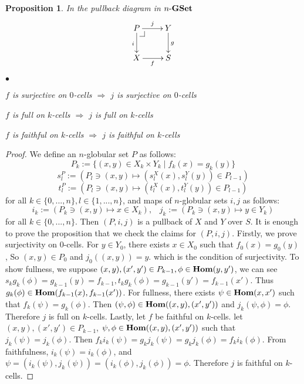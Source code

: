 \documentclass[12pt]{article}
\makeatletter
\theoremstyle{plain}
\newtheorem{proposition}[theorem]{Proposition}
\theoremstyle{definition}
\newcommand{\pullbackmark}[2]{\save ;p+<.8pc,0pc>:(0,-1)::%
(#1) *{\phantom{Z}} %
;p+(#2)-(0,0) **@{-}%
;p-(#1)+(0,0) *{\phantom{Z}} **@{-} \restore}
\makeatother
\begin{document}
\begin{proposition}
In the pullback diagram in $n \mathchar`- {\bf GSet}$
\[ \xymatrix{
 P \pullbackmark{1,0}{0,1} \ar[r]^j \ar[d]_i & Y \ar[d]^g \\
 X \ar[r]_f & S
} \]
\begin{list}{$\bullet$}{}
\item $f$ is surjective on $0$-cells $\Rightarrow$ $j$ is surjective on $0$-cells
\item $f$ is full on $k$-cells $\Rightarrow$ $j$ is full on $k$-cells
\item $f$ is faithful on $k$-cells $\Rightarrow$ $j$ is faithful on $k$-cells
\end{list}
\end{proposition}

\begin{proof} We define an $n$-globular set $P$ as follows:
\[ P_k := \{ (x,y) \in X_k \times Y_k \mid f_k(x)=g_k(y) \}  \]
\[ s_l^P := ( P_l \ni (x,y) \mapsto (s_l^X (x), s_l^Y (y) ) \in P_{l-1} ) \]
\[ t_l^P := ( P_l \ni (x,y) \mapsto (t_l^X (x), t_l^Y (y) ) \in P_{l-1} ) \]
for all $k \in \{ 0,...,n \}, l \in \{ 1,...,n \}$, and maps of $n$-globular sets $i,j$ as follows:
\[
i_k := (P_k \ni (x,y) \mapsto x \in X_k), \hspace{10pt} j_k := (P_k \ni (x,y) \mapsto y \in Y_k)
\]
for all $k \in \{ 0,...,n \}$. Then $(P,i,j)$ is a pullback of $X$ and $Y$ over $S$. It is enough to prove the proposition that we check the claims for $(P,i,j)$.
Firstly, we prove surjectivity on $0$-cells. For $y \in Y_0$, there exists $x \in X_0$ such that $f_{0}(x)=g_{0}(y)$, So $(x,y) \in P_{0}$ and $j_{0}((x,y))=y$. which is the condition of surjectivity.
To show fullness, we suppose $(x,y), (x',y') \in P_{k-1}, \phi \in {\bf Hom}(y,y')$, we can see $s_{k} g_{k}(\phi)=g_{k-1}(y)=f_{k-1}, t_{k} g_{k} (\phi)=g_{k-1} (y')=f_{k-1} (x')$. Thus $g_{k} (\phi) \in {\bf Hom}(f_{k-1}(x), f_{k-1}(x'))$. For fullness, there exists $\psi \in {\bf Hom}(x,x')$ such that $f_k (\psi) = g_k (\phi)$. Then $(\psi , \phi ) \in {\bf Hom}((x,y),(x',y'))$ and $j_k (\psi ,\phi ) =\phi$. Therefore $j$ is full on $k$-cells. 
Lastly, let $f$ be faithful on $k$-cells. let $(x,y), (x',y') \in P_{k-1}$, $ \psi, \phi \in {\bf Hom}((x,y), (x', y'))$ such that $j_{k}(\psi)=j_{k}(\phi)$. Then $f_k i_k(\psi)=g_k j_k (\psi)=g_k j_k (\phi)=f_k i_k(\phi)$. From faithfulness, $i_k (\psi)= i_k (\phi)$, and $\psi = (i_k (\psi ), j_k (\psi ))=(i_k (\phi ), j_k (\phi ))=\phi $. Therefore $j$ is faithful on $k$-cells.
\end{proof}
\end{document}
